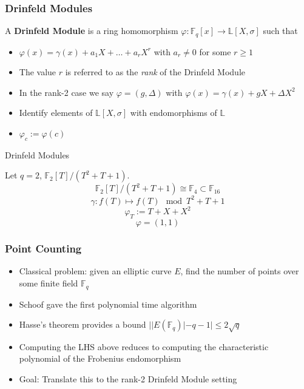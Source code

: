 \documentclass{beamer}
\newcommand{\f}{\mathbb{F}}
\begin{document}
\begin{frame}
\frametitle{Drinfeld Modules}

\begin{definition}
A \textbf{Drinfeld Module} is a ring homomorphism $\varphi: \mathbb{F}_q[x] \to \mathbb{L}[X,\sigma]$ such that 

\begin{itemize}
    \item $\varphi(x) = \gamma(x) + a_1X + \ldots + a_rX^r$ with $a_r \neq 0$ for some $r \geq 1$
\end{itemize}
\end{definition}

\begin{itemize}
    \item The value $r$ is referred to as the \textit{rank} of the Drinfeld Module
        \item In the rank-2 case we say $\varphi = (g, \Delta)$ with $\varphi(x) = \gamma(x) + gX + \Delta X^2$
        \item Identify elements of $\mathbb{L}[X,\sigma]$ with endomorphisms of $\mathbb{L}$
        \item $\varphi_c := \varphi(c)$
 
 \end{itemize}
 \end{frame}
 
 \begin{frame}{Drinfeld Modules}
   \begin{example}
   Let $q =2$, $\mathbb{F}_2[T]/(T^2 + T + 1)$.
   \[ \f_2[T]/(T^2 + T + 1) \cong \f_4 \subset \f_{16}\]
   \[ \gamma : f(T) \mapsto f(T) \mod T^2 + T + 1  \]
   \[ \varphi_T := T + X + X^2 \]
   \[ \varphi = (1,1)\]
   \end{example}

\end{frame}






\begin{frame}
\frametitle{Point Counting}

\begin{itemize}
\item Classical problem: given an elliptic curve $E$, find the number of points over some finite field $\mathbb{F}_q$ 
\item Schoof gave the first polynomial time algorithm
\item Hasse's theorem provides a bound $ | |E(\mathbb{F}_q)| - q - 1  | \leq 2 \sqrt{q} $

\item Computing the LHS above reduces to computing the characteristic polynomial of the Frobenius endomorphism

\item Goal: Translate this to the rank-2 Drinfeld Module setting
\end{itemize}

\end{frame}
\end{document}
